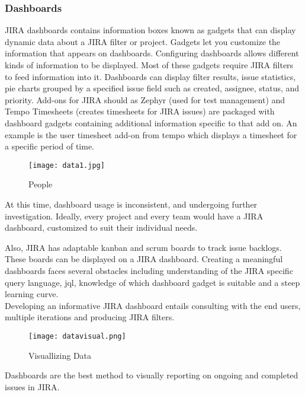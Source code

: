  \subsubsection{Dashboards}
 JIRA dashboards contains information boxes known as gadgets that can display dynamic data about a JIRA filter or project. Gadgets let you customize the information that appears on dashboards. Configuring dashboards allows different kinds of information to be displayed.  Most of these gadgets require JIRA filters to feed information into it. Dashboards can display filter results, issue statistics, pie charts grouped by a specified issue field such as created, assignee, status, and priority. Add-ons for JIRA should as Zephyr (used for test management) and Tempo Timesheets (creates timesheets for JIRA issues) are packaged with dashboard gadgets containing additional information specific to that add on. An example is the user timesheet add-on from tempo which displays a timesheet for a specific period of time.  \\ 
 \begin{figure}[H]
 	\texttt{[image: data1.jpg]}
 	\caption{People}
 \end{figure}

At this time, dashboard usage is inconsistent, and undergoing further investigation. Ideally, every project and every team would have a JIRA dashboard, customized to suit their individual needs.  

Also, \gls{JIRA} has adaptable \gls{kanban} and \gls{scrum} boards to track issue backlogs. These boards can be displayed on a JIRA dashboard. Creating a meaningful dashboards faces several obstacles including understanding of the JIRA specific query language, \gls{jql}, knowledge of which dashboard gadget is suitable and a steep learning curve.  \\

Developing an informative \gls{JIRA} dashboard entails consulting with the end users, multiple iterations and producing JIRA filters.

 \begin{figure}[H]
	\texttt{[image: datavisual.png]}
	\caption{Visuallizing Data}
 \end{figure}

Dashboards are the best method to visually reporting on ongoing and completed issues in \gls{JIRA}.

